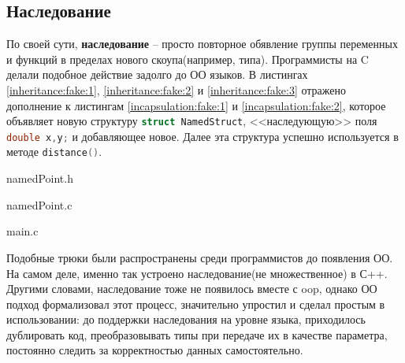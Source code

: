\subsection{Наследование}
\label{sec:inheritance}

По своей сути, \textbf{наследование} -- просто повторное обявление группы переменных и функций в пределах нового скоупа(например, типа). Программисты на C делали подобное действие задолго до ОО языков. В листингах \ref{inheritance:fake:1}, \ref{inheritance:fake:2} и \ref{inheritance:fake:3} отражено дополнение к листингам \ref{incapsulation:fake:1} и \ref{incapsulation:fake:2}, которое объявляет новую структуру \lstinline[language=C]{struct NamedStruct}, <<наследующую>> поля \lstinline[language=C]{double x,y;} и добавляющее новое. Далее эта структура успешно используется в методе \lstinline[language=C]{distance()}.

\begin{code}
	
   \caption{namedPoint.h}
   \label{inheritance:fake:1}
\end{code}

\begin{code}
	
   \caption{namedPoint.c}
   \label{inheritance:fake:2}
\end{code}

\begin{code}
	
   \caption{main.c}
   \label{inheritance:fake:3}
\end{code}

Подобные трюки были распространены среди программистов до появления ОО. На самом деле, именно так устроено наследование(не множественное) в С++. Другими словами, наследование тоже не появилось вместе с \gls{oop}, однако ОО подход формализовал этот процесс, значительно упростил и сделал простым в использовании: до поддержки наследования на уровне языка, приходилось дублировать код, преобразовывать типы при передаче их в качестве параметра, постоянно следить за корректностью данных самостоятельно.